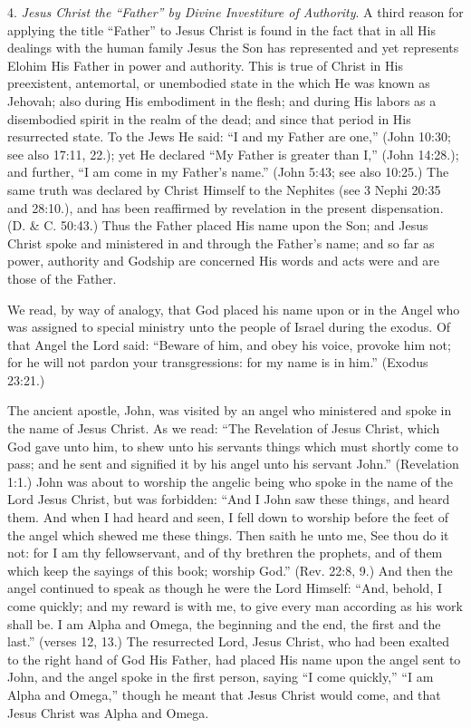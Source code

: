 4. \textit{Jesus Christ the ``Father'' by Divine Investiture of Authority}. A third reason for applying
the title ``Father'' to Jesus Christ is found in the fact that in all His dealings with the human
family Jesus the Son has represented and yet represents Elohim His Father in power and
authority. This is true of Christ in His preexistent, antemortal, or unembodied state in the
which He was known as Jehovah; also during His embodiment in the flesh; and during His
labors as a disembodied spirit in the realm of the dead; and since that period in His
resurrected state. To the Jews He said: ``I and my Father are one,'' (John 10:30; see also
17:11, 22.); yet He declared ``My Father is greater than I,'' (John 14:28.); and further, ``I am
come in my Father's name.'' (John 5:43; see also 10:25.) The same truth was declared by
Christ Himself to the Nephites (see 3 Nephi 20:35 and 28:10.), and has been reaffirmed by
revelation in the present dispensation. (D. \& C. 50:43.) Thus the Father placed His name
upon the Son; and Jesus Christ spoke and ministered in and through the Father's name; and
so far as power, authority and Godship are concerned His words and acts were and are those
of the Father.

We read, by way of analogy, that God placed his name upon or in the Angel who was
assigned to special ministry unto the people of Israel during the exodus. Of that Angel the
Lord said: ``Beware of him, and obey his voice, provoke him not; for he will not pardon your
transgressions: for my name is in him.'' (Exodus 23:21.)

The ancient apostle, John, was visited by an angel who ministered and spoke in the name of
Jesus Christ. As we read: ``The Revelation of Jesus Christ, which God gave unto him, to shew
unto his servants things which must shortly come to pass; and he sent and signified it by his
angel unto his servant John.'' (Revelation 1:1.) John was about to worship the angelic being
who spoke in the name of the Lord Jesus Christ, but was forbidden: ``And I John saw these
things, and heard them. And when I had heard and seen, I fell down to worship before the
feet of the angel which shewed me these things. Then saith he unto me, See thou do it not:
for I am thy fellowservant, and of thy brethren the prophets, and of them which keep the
sayings of this book; worship God.'' (Rev. 22:8, 9.) And then the angel continued to speak as
though he were the Lord Himself: ``And, behold, I come quickly; and my reward is with me,
to give every man according as his work shall be. I am Alpha and Omega, the beginning and
the end, the first and the last.'' (verses 12, 13.) The resurrected Lord, Jesus Christ, who had
been exalted to the right hand of God His Father, had placed His name upon the angel sent to
John, and the angel spoke in the first person, saying ``I come quickly,'' ``I am Alpha and
Omega,'' though he meant that Jesus Christ would come, and that Jesus Christ was Alpha and
Omega.

